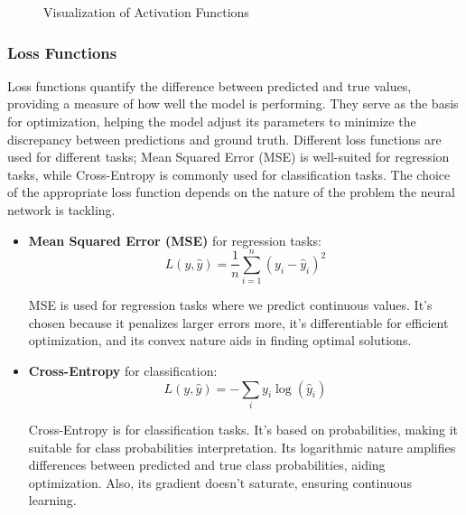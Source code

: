 \begin{figure}[h!]
\centering
{}
\caption{Visualization of Activation Functions}
\label{fig:activation_functions}
\end{figure}


\subsubsection*{Loss Functions}

Loss functions quantify the difference between predicted and true values, providing a measure of how well the model is performing. They serve as the basis for optimization, helping the model adjust its parameters to minimize the discrepancy between predictions and ground truth. Different loss functions are used for different tasks; Mean Squared Error (MSE) is well-suited for regression tasks, while Cross-Entropy is commonly used for classification tasks. The choice of the appropriate loss function depends on the nature of the problem the neural network is tackling.

\begin{itemize}
    \item \textbf{Mean Squared Error (MSE)} for regression tasks:
    \[ L(y, \hat{y}) = \frac{1}{n} \sum_{i=1}^{n} (y_i - \hat{y}_i)^2 \]

    MSE is used for regression tasks where we predict continuous values. It's chosen because it penalizes larger errors more, it's differentiable for efficient optimization, and its convex nature aids in finding optimal solutions.
    
    \item \textbf{Cross-Entropy} for classification:
    \[ L(y, \hat{y}) = -\sum_{i} y_i \log(\hat{y}_i) \]

    Cross-Entropy is for classification tasks. It's based on probabilities, making it suitable for class probabilities interpretation. Its logarithmic nature amplifies differences between predicted and true class probabilities, aiding optimization. Also, its gradient doesn't saturate, ensuring continuous learning.

\end{itemize}


